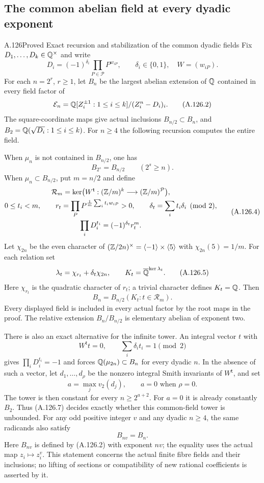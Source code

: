 \subsection{The common abelian field at every dyadic exponent}

\begin{statement}{A.126}{Proved}
{Exact recursion and stabilization of the common dyadic fields}
Fix $D_1,\ldots,D_k\in\mathbb Q^\times$ and write
\[
 D_i=(-1)^{\delta_i}\prod_{P\in\mathcal P}P^{w_{iP}},
 \qquad \delta_i\in\{0,1\},\quad W=(w_{iP}).
\tag{A.126.1}
\]
For each $n=2^r$, $r\ge1$, let $B_n$ be the largest
abelian extension of $\mathbb Q$ contained in every field factor of
\[
 \mathcal E_n=\mathbb Q[Z_i^{\pm1}:1\le i\le k]/(Z_i^n-D_i)_i.
\tag{A.126.2}
\]
The square-coordinate maps give actual inclusions
$B_{n/2}\subset B_n$, and $B_2=\mathbb Q(\sqrt{D_i}:1\le i\le k)$.
For $n\ge4$ the following recursion computes the entire field.

When $\mu_n$ is not contained in $B_{n/2}$, one has
\[
             B_{2^s}=B_{n/2}\qquad(2^s\ge n).
\tag{A.126.3}
\]
When $\mu_n\subset B_{n/2}$, put $m=n/2$ and define
\[
 \begin{gathered}
 \mathcal R_m=\ker\bigl(W^{\mathsf t}:(\mathbb Z/m)^k
                                      \longrightarrow(\mathbb Z/m)^{\mathcal P}\bigr),\\
 0\le t_i<m,\qquad
 r_t=\prod_P P^{\frac1m\sum_i t_iw_{iP}}>0,
 \qquad \delta_t=\sum_i t_i\delta_i\pmod2,\\
 \prod_iD_i^{t_i}=(-1)^{\delta_t}r_t^m.
 \end{gathered}
\tag{A.126.4}
\]
Let $\chi_{2n}$ be the even character of
$(\mathbb Z/2n)^\times=\langle-1\rangle\times\langle5\rangle$
with $\chi_{2n}(5)=1/m$.
For each relation set
\[
 \lambda_t=\chi_{r_t}+\delta_t\chi_{2n},
 \qquad K_t=\overline{\mathbb Q}^{\ker\lambda_t}.
\tag{A.126.5}
\]
Here $\chi_{r_t}$ is the quadratic character of $r_t$;
a trivial character defines $K_t=\mathbb Q$.
Then
\[
                    B_n=B_{n/2}(K_t:t\in\mathcal R_m).
\tag{A.126.6}
\]
Every displayed field is included in every actual factor
by the root maps in the proof.  The relative extension
$B_n/B_{n/2}$ is elementary abelian of exponent two.

There is also an exact alternative for the infinite tower.
An integral vector $t$ with
\[
                 W^{\mathsf t}t=0,\qquad
                         \sum_i\delta_i t_i=1\pmod2
\tag{A.126.7}
\]
gives $\prod_iD_i^{t_i}=-1$ and forces
$\mathbb Q(\mu_{2n})\subset B_n$ for every dyadic $n$.
In the absence of such a vector, let $d_1,\ldots,d_\rho$
be the nonzero integral Smith invariants of $W^{\mathsf t}$,
and set
\[
       a=\max_j v_2(d_j),\qquad a=0\text{ when }\rho=0.
\tag{A.126.8}
\]
The tower is then constant for every $n\ge2^{a+2}$.
For $a=0$ it is already constantly $B_2$.
Thus (A.126.7) decides exactly whether this common-field
tower is unbounded.  For any odd positive integer $v$ and
any dyadic $n\ge4$, the same radicands also satisfy
\[
                            B_{nv}=B_n.
\tag{A.126.21}
\]
Here $B_{nv}$ is defined by (A.126.2) with exponent $nv$;
the equality uses the actual map $z_i\mapsto z_i^v$.
This statement concerns the actual
finite fibre fields and their inclusions; no lifting of
sections or compatibility of new rational coefficients is
asserted by it.
\end{statement}
